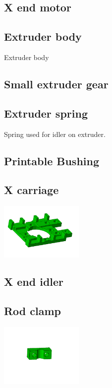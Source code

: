 \documentclass[11pt]{article}
\begin{document}
\hypertarget{thing_x-end-motor}{\subsection{X end motor}}

\hypertarget{thing_extruder-body}{\subsection{Extruder body}}
Extruder body

\hypertarget{thing_small-gear}{\subsection{Small extruder gear}}

\hypertarget{thing_extruder-spring}{\subsection{Extruder spring}}
Spring used for idler on extruder.

\hypertarget{thing_printable-bushing}{\subsection{Printable Bushing}}

\hypertarget{thing_x-carriage}{\subsection{X carriage}}
\includegraphics[width=4cm]{images/x-carriage.jpg}

\hypertarget{thing_x-end-idler}{\subsection{X end idler}}

\hypertarget{thing_rod-clamp}{\subsection{Rod clamp}}
\includegraphics[width=4cm]{images/rod-clamp.jpg}
\end{document}
